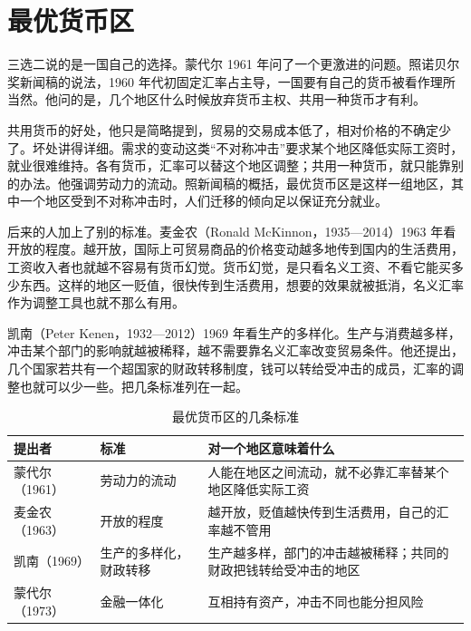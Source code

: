 \section{最优货币区}\label{sec:mundell-oca}

三选二说的是一国自己的选择。蒙代尔 1961 年问了一个更激进的问题。照诺贝尔奖新闻稿的说法，1960 年代初固定汇率占主导，一国要有自己的货币被看作理所当然\cite{nobel1999}。他问的是，几个地区什么时候放弃货币主权、共用一种货币才有利\cite{nobel1999}。

共用货币的好处，他只是简略提到，贸易的交易成本低了，相对价格的不确定少了\cite{nobel1999}。坏处讲得详细。需求的变动这类“不对称冲击”要求某个地区降低实际工资时，就业很难维持\cite{nobel1999}。各有货币，汇率可以替这个地区调整；共用一种货币，就只能靠别的办法。他强调劳动力的流动\cite{nobel1999}。照新闻稿的概括，最优货币区是这样一组地区，其中一个地区受到不对称冲击时，人们迁移的倾向足以保证充分就业\cite{nobel1999}。

后来的人加上了别的标准\cite{nobel1999}。麦金农（Ronald McKinnon，1935—2014）1963 年看开放的程度\cite{mongelli2002,gnd37}。越开放，国际上可贸易商品的价格变动越多地传到国内的生活费用，工资收入者也就越不容易有货币幻觉\cite{mongelli2002}。货币幻觉，是只看名义工资、不看它能买多少东西。这样的地区一贬值，很快传到生活费用，想要的效果就被抵消，名义汇率作为调整工具也就不那么有用\cite{mongelli2002}。

凯南（Peter Kenen，1932—2012）1969 年看生产的多样化\cite{mongelli2002,loc37,gnd37}。生产与消费越多样，冲击某个部门的影响就越被稀释，越不需要靠名义汇率改变贸易条件\cite{mongelli2002}。他还提出，几个国家若共有一个超国家的财政转移制度，钱可以转给受冲击的成员，汇率的调整也就可以少一些\cite{mongelli2002}。把几条标准列在一起。

\begin{table}[tbp]
\centering\small
\caption{最优货币区的几条标准}\label{tab:mundell-oca}
\begin{tabularx}{\linewidth}{@{}l l X@{}}
\toprule
提出者 & 标准 & 对一个地区意味着什么 \\
\midrule
蒙代尔（1961） & 劳动力的流动 & 人能在地区之间流动，就不必靠汇率替某个地区降低实际工资 \\
麦金农（1963） & 开放的程度 & 越开放，贬值越快传到生活费用，自己的汇率越不管用 \\
凯南（1969） & 生产的多样化，财政转移 & 生产越多样，部门的冲击越被稀释；共同的财政把钱转给受冲击的地区 \\
蒙代尔（1973） & 金融一体化 & 互相持有资产，冲击不同也能分担风险 \\
\bottomrule
\end{tabularx}
\end{table}

